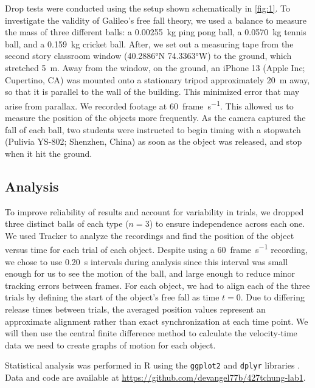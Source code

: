 \documentclass[reprint,amsmath,amssymb,aps,twoside]{revtex4-2}
\begin{document}
Drop tests were conducted using the setup shown schematically in \cref{fig:1}. To investigate the validity of Galileo’s free fall theory, we used a balance to measure the mass of three different balls: a \qty{0.00255}{\kilo\gram} ping pong ball, a \qty{0.0570}{\kilo\gram} tennis ball, and a \qty{0.159}{\kilo\gram} cricket ball. After, we set out a measuring tape from the second story classroom window (\ang{40.2886}N \ang{74.3363}W) to the ground, which stretched \qty{5}{\meter}. Away from the window, on the ground, an iPhone 13 (Apple Inc; Cupertino, CA) was mounted onto a stationary tripod approximately \qty{20}{\meter} away, so that it is parallel to the wall of the building. This minimized error that may arise from parallax. We recorded footage at \qty{60}{frame\per\second}. This allowed us to measure the position of the objects more frequently. As the camera captured the fall of each ball, two students were instructed to begin timing with a stopwatch (Pulivia YS-802; Shenzhen, China) as soon as the object was released, and stop when it hit the ground.

\subsection{Analysis}
To improve reliability of results and account for variability in trials, we dropped three distinct balls of each type ($n=3$) to ensure independence across each one. We used Tracker \cite{tracker} \cite{tracker, renika:2024:kinematics} to analyze the recordings and find the position of the object versus time for each trial of each object. Despite using a \qty{60}{frame\per\second} recording, we chose to use \qty{0.20}{\second} intervals during analysis since this interval was small enough for us to see the motion of the ball, and large enough to reduce minor tracking errors between frames. For each object, we had to align each of the three trials by defining the start of the object’s free fall as time $t=0$. Due to differing release times between trials, the averaged position values represent an approximate alignment rather than exact synchronization at each time point. We will then use the central finite difference method to calculate the velocity-time data we need to create graphs of motion for each object.

Statistical analysis \cite{starnes:2015:practice} was performed in R \cite{R} using the \texttt{ggplot2} and \texttt{dplyr} libraries \cite{ggplot2, dplyr}. Data and code are available at \url{https://github.com/devangel77b/427tchung-lab1}.
\end{document}
